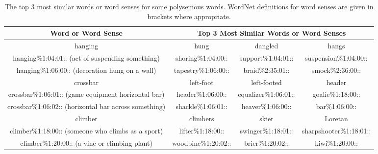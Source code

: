 \documentclass[11pt]{article}
\begin{document}
\begin{table*}[ht]
\begin{center}
\begin{small}
\begin{tabular}{|c|ccc|}
\hline 
Word or Word Sense & \multicolumn{3}{c|}{Top 3 Most Similar Words or Word Senses}\tabularnewline
\hline 
hanging & hung & dangled & hangs\tabularnewline
hanging\%1:04:01:: (act of suspending something) & shoring\%1:04:00:: & support\%1:04:01:: & suspension\%1:04:00::\tabularnewline
hanging\%1:06:00:: (decoration hung on a wall) & tapestry\%1:06:00:: & braid\%2:35:01:: & smock\%2:36:00::\tabularnewline
\hline 
crossbar & left-foot & left-footed & header\tabularnewline
crossbar\%1:06:01:: (game equipment horizontal bar) & header\%1:06:00:: & equalizer\%1:06:01:: & goalie\%1:18:00::\tabularnewline
crossbar\%1:06:02:: (horizontal bar across something) & shackle\%1:06:01:: & heaver\%1:06:00:: & bar\%1:06:00::\tabularnewline
\hline 
climber & climbers & skier & Loretan\tabularnewline
climber\%1:18:00:: (someone who climbs as a sport) & lifter\%1:18:00:: & swinger\%1:18:01:: & sharpshooter\%1:18:01::\tabularnewline
climber\%1:20:00:: (a vine or climbing plant) & woodbine\%1:20:02:: & brier\%1:20:02:: & kiwi\%1:20:00::\tabularnewline
\hline 
\end{tabular}
\end{small}
\caption{The top 3 most similar words or word senses for some polysemous words. WordNet definitions for word senses are given in brackets where appropriate. 
}\label{tbl:mostsim}
\end{center}
\end{table*}
\end{document}
